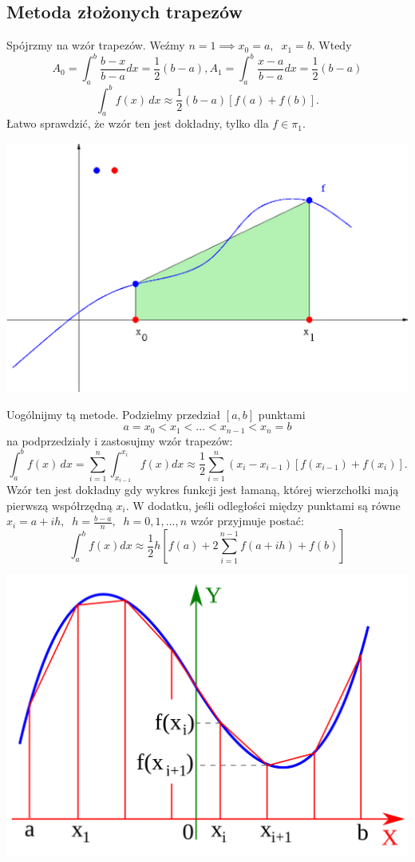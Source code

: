 \documentclass[12p]{article}
\begin{document}
\subsection{Metoda złożonych trapezów}

Spójrzmy na wzór trapezów. Weźmy $n=1 \implies x_{0} = a, \;\; x_{1} = b$. Wtedy \[A_{0} = \int_{a}^{b} \frac{b-x}{b-a}dx = \frac{1}{2}(b-a), A_{1} = \int_{a}^{b} \frac{x-a}{b-a}dx = \frac{1}{2}(b-a)\]
\[ \int_{a}^{b} f(x) \,dx \approx \frac{1}{2}(b-a)[f(a)+f(b)].\]
Łatwo sprawdzić, że wzór ten jest dokładny, tylko dla $f \in \pi_{1}$.
\begin{center}
\includegraphics[scale=0.6]{img1.png}
\end{center}

Uogólnijmy tą metode. Podzielmy przedział $[a,b]$ punktami
\[ a = x_{0} < x_{1}<...<x_{n-1} < x_{n} = b\]
na podprzedziały i zastosujmy wzór trapezów:
	\[ \int_{a}^{b} f(x) \,dx = \sum_{i=1}^{n} \int_{x_{i-1}}^{x_i} f(x)dx \approx \frac{1}{2} \sum_{i=1}^{n} (x_{i} - x_{i-1})[f(x_{i-1})+f(x_{i})].\]
Wzór ten jest dokładny gdy wykres funkcji jest łamaną, której wierzchołki mają pierwszą współrzędną $x_{i}$.
W dodatku, jeśli odległości między punktami są równe $x_{i} = a + ih, \;\; h=\frac{b-a}{n}, \;\; h=0,1,...,n$ wzór przyjmuje postać:
\[ \int_{a}^{b} f(x)dx \approx \frac{1}{2}h[f(a)+ 2\sum_{i=1}^{n-1}f(a+ih)+f(b)] \]
\begin{center}
\includegraphics[scale=0.2]{img2.png}
\end{center}
\end{document}
